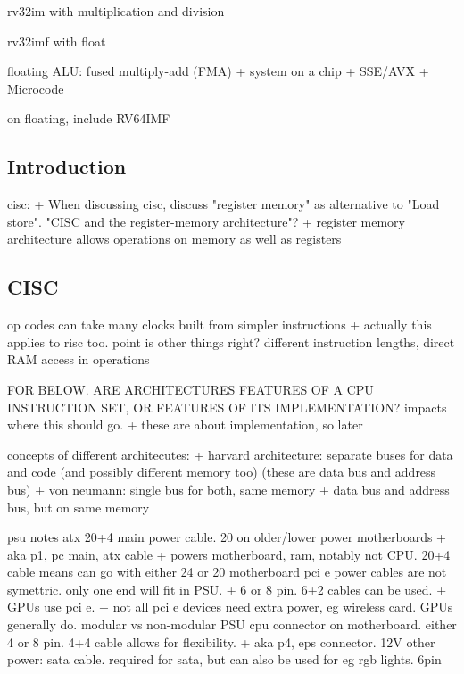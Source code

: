 rv32im
with multiplication and division

rv32imf
with float

floating ALU: fused multiply-add (FMA)
+ system on a chip
+ SSE/AVX
+ Microcode


on floating, include RV64IMF



\subsection{Introduction}

cisc:
+ When discussing cisc, discuss "register memory" as alternative to "Load store". "CISC and the register-memory architecture"?
+ register memory architecture allows operations on memory as well as registers

\subsection{CISC}
op codes can take many clocks built from simpler instructions
+ actually this applies to risc too. point is other things right? different instruction lengths, direct RAM access in operations

















FOR BELOW. ARE ARCHITECTURES FEATURES OF A CPU INSTRUCTION SET, OR FEATURES OF ITS IMPLEMENTATION? impacts where this should go.
+ these are about implementation, so later









concepts of different architecutes:
+ harvard architecture: separate buses for data and code (and possibly different memory too) (these are data bus and address bus)
+ von neumann: single bus for both, same memory
+ data bus and address bus, but on same memory






psu notes
atx 20+4 main power cable. 20 on older/lower power motherboards
+ aka p1, pc main, atx cable
+ powers motherboard, ram, notably not CPU. 20+4 cable means can go with either 24 or 20 motherboard
pci e power cables are not symettric. only one end will fit in PSU.
+ 6 or 8 pin. 6+2 cables can be used.
+ GPUs use pci e.
+ not all pci e devices need extra power, eg wireless card. GPUs generally do.
modular vs non-modular PSU
cpu connector on motherboard. either 4 or 8 pin. 4+4 cable allows for flexibility.
+ aka p4, eps connector. 12V
other power: sata cable. required for sata, but can also be used for eg rgb lights. 6pin

